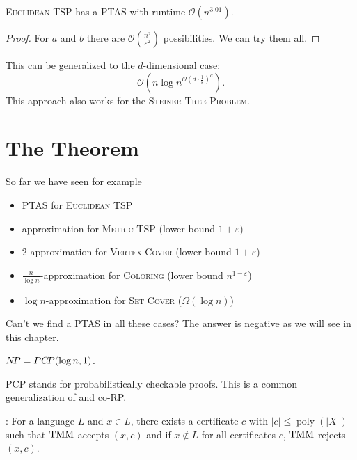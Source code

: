 \documentclass[../skript.tex]{subfiles}
\begin{document}
\begin{theorem} %
\label{thm:98}
\textsc{Euclidean TSP} has a \ac{PTAS} with runtime $\mathcal{O}\left(n^{3.01} \right)$.
\end{theorem}
\begin{proof}
For $a$ and $b$ there are $\mathcal{O} \left( \frac{n^2}{\varepsilon^2} \right)$ possibilities. We can try them all.
\end{proof}
This can be generalized to the $d$-dimensional case:
\[
	\mathcal{O}(n \log n^{\mathcal{O} \left( d \cdot \frac{1}{\varepsilon} \right)^d}).
\]
This approach also works for the \textsc{Steiner Tree Problem}.
\chapter{The \texorpdfstring{\PCP{}}{PCP} Theorem} %
\label{sec:c7}
So far we have seen for example
\begin{itemize}
\item \ac{PTAS} for \textsc{Euclidean TSP}
\item {} approximation for \textsc{Metric TSP} (lower bound $1 + \varepsilon$)
\item 2-approximation for \textsc{Vertex Cover} (lower bound $1 + \varepsilon$)
\item $\frac{n}{\log n}$-approximation for \textsc{Coloring} (lower bound $n^{1-\varepsilon}$)
\item $\log n$-approximation for \textsc{Set Cover} ($\Omega(\log n)$)
\end{itemize}
Can't we find a PTAS in all these cases? The answer is negative as we will see in this chapter.
\begin{theorem} %
\label{thm:99}
$N \! P = PC \! P(\log n, 1)$.
\end{theorem}
PCP stands for probabilistically checkable proofs. This is a common generalization of \NP{} and co-RP.

\NP{}: For a language $L$ and $x \in L$, there exists a certificate $c$ with $|c| \leq \operatorname{poly}(|X|)$ such that $\operatorname{TMM}$ accepts $(x, c)$ and if $x \notin L$ for all certificates $c$, $\operatorname{TMM}$ rejects $(x, c)$.
\end{document}
